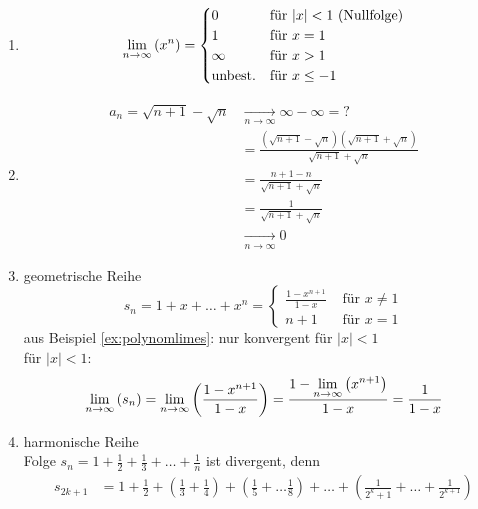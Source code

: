 \begin{example}[Anwendungen]
\begin{enumerate}
  \item\label{ex:polynomlimes}
    \[
      \lim_{n \rightarrow \infty} \left( x^n \right) = \begin{cases}
                          0 & \text{für $\left|x\right| < 1$ (Nullfolge)} \\
                          1 & \text{für $x=1$} \\
                          \infty & \text{für $x>1$} \\
                          \text{unbest.} & \text{für $x \leq -1$}
                       \end{cases}
    \]
  \item
    \begin{align*}
      a_n = \sqrt{n+1} - \sqrt n &\xrightarrow[n \rightarrow \infty]{} \infty - \infty = \text{?}\\
      &= \frac{(\sqrt{n+1}-\sqrt n)(\sqrt{n+1}+\sqrt n)}{\sqrt{n+1}+\sqrt n}\\
      &= \frac{n+1-n}{\sqrt{n+1}+\sqrt n}\\
      &= \frac 1 {\sqrt{n+1} + \sqrt n}\\
      &\xrightarrow[n \rightarrow \infty]{} 0
    \end{align*}
  \item geometrische Reihe
    \begin{equation*}
      s_n = 1 + x + \ldots + x^n = \begin{cases}
                                     \frac{1-x^{n+1}}{1-x} & \text{ für } x \neq 1 \\
                                     n + 1 & \text{ für } x = 1
                                   \end{cases}
    \end{equation*}
    aus Beispiel \ref{ex:polynomlimes}: nur konvergent für $\left| x \right| < 1$\\
    für $\left| x \right| < 1$:
    \begin{equation*}
      \lim_{n \rightarrow \infty} \left( s_n \right) = \lim_{n \rightarrow \infty} \left( \frac{1-x^{n+1}}{1-x} \right) = \frac{1-\displaystyle\lim_{n \rightarrow \infty} \left( x^{n+1} \right)}{1-x} = \frac 1 {1-x}
    \end{equation*}
  \item harmonische Reihe\\
    Folge $s_n = \displaystyle 1 + \frac 1 2 + \frac 1 3 + \ldots + \frac 1 n$ ist divergent, denn
    \begin{align*}
      s_{2k+1} &= 1 + \frac 1 2 + \left( \frac 1 3 + \frac 1 4 \right) + \left( \frac 1 5 + \ldots \frac 1 8 \right) + \ldots + \left(\frac 1 {2^k+1} + \ldots + \frac 1 {2^{k+1}}\right) \\

\end{align*}
\end{enumerate}
\end{example}
